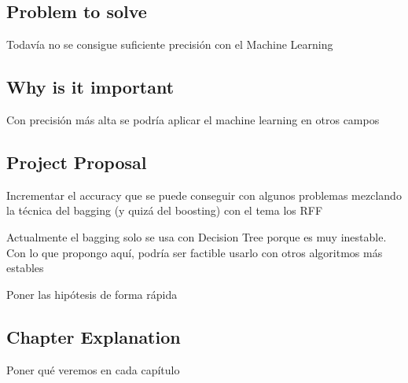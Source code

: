 \subsection{Problem to solve}
  Todavía no se consigue suficiente precisión con el Machine Learning
\subsection{Why is it important}
  Con precisión más alta se podría aplicar el machine learning en otros campos
\subsection{Project Proposal}
  Incrementar el accuracy que se puede conseguir con algunos problemas mezclando
  la técnica del bagging (y quizá del boosting) con el tema los RFF

  Actualmente el bagging solo se usa con Decision Tree porque es muy inestable.
  Con lo que propongo aquí, podría ser factible usarlo con otros algoritmos más
  estables


  Poner las hipótesis de forma rápida
\subsection{Chapter Explanation}
  Poner qué veremos en cada capítulo
